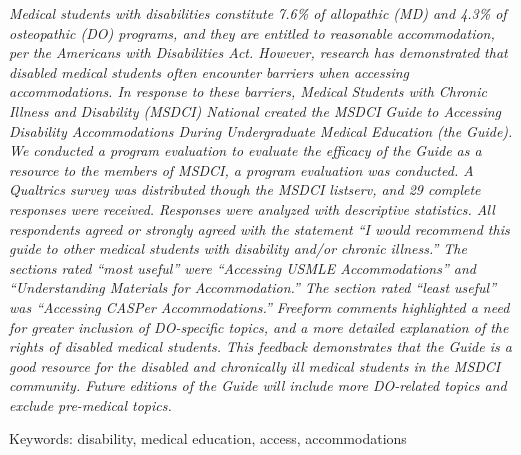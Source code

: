 \documentclass[11.5pt]{sig-alternate} %
\makeatletter
\let\oldabstract\abstract
\let\oldendabstract\endabstract
\renewenvironment{abstract} %
{\renewenvironment{quotation}%
               {\list{}{\addtolength{\leftmargin}{1em} %
                        \listparindent 1.5em%
                        \itemindent    \listparindent%
                        \rightmargin   \leftmargin%
                        \parsep        \z@ \@plus\p@}%
                \item\relax}%
               {\endlist}%
\oldabstract}
{\oldendabstract}
\makeatother
\begin{document}
\maketitle %
\begin{@twocolumnfalse} 
\begin{abstract}
\item %
\begin{large}
\textit{Medical students with disabilities constitute 7.6\% of allopathic (MD) and 4.3\% of osteopathic (DO) programs, and they are entitled to reasonable accommodation, per the Americans with Disabilities Act. However, research has demonstrated that disabled medical students often encounter barriers when accessing accommodations. In response to these barriers, Medical Students with Chronic Illness and Disability (MSDCI) National created the MSDCI Guide to Accessing Disability Accommodations During Undergraduate Medical Education (the Guide). We conducted a program evaluation to evaluate the efficacy of the Guide as a resource to the members of MSDCI, a program evaluation was conducted. A Qualtrics survey was distributed though the MSDCI listserv, and 29 complete responses were received. Responses were analyzed with descriptive statistics. All respondents agreed or strongly agreed with the statement “I would recommend this guide to other medical students with disability and/or chronic illness.” The sections rated “most useful” were “Accessing USMLE Accommodations” and “Understanding Materials for Accommodation.” The section rated “least useful” was “Accessing CASPer Accommodations.” Freeform comments highlighted a need for greater inclusion of DO-specific topics, and a more detailed explanation of the rights of disabled medical students. This feedback demonstrates that the Guide is a good resource for the disabled and chronically ill medical students in the MSDCI community. Future editions of the Guide will include more DO-related topics and exclude pre-medical topics.}
\item Keywords: disability, medical education, access, accommodations
\end{large}     
\end{abstract}
\end{@twocolumnfalse}
\end{document}
